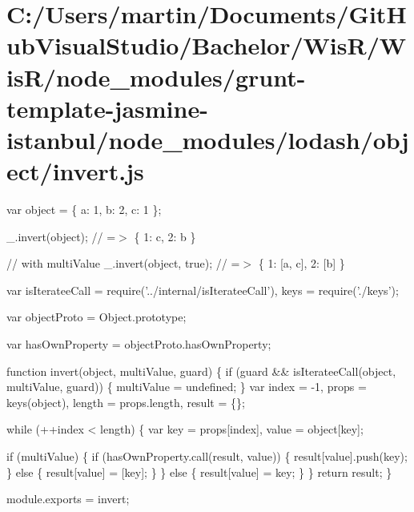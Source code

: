 \hypertarget{_c_1_2_users_2martin_2_documents_2_git_hub_visual_studio_2_bachelor_2_wis_r_2_wis_r_2node_moduleb4793deb825e06c600c1d3dfd71b7dc9}{}\section{C\+:/\+Users/martin/\+Documents/\+Git\+Hub\+Visual\+Studio/\+Bachelor/\+Wis\+R/\+Wis\+R/node\+\_\+modules/grunt-\/template-\/jasmine-\/istanbul/node\+\_\+modules/lodash/object/invert.\+js}
var object = \{ \textquotesingle{}a\textquotesingle{}\+: 1, \textquotesingle{}b\textquotesingle{}\+: 2, \textquotesingle{}c\textquotesingle{}\+: 1 \};

\+\_\+.\+invert(object); // =$>$ \{ \textquotesingle{}1\textquotesingle{}\+: \textquotesingle{}c\textquotesingle{}, \textquotesingle{}2\textquotesingle{}\+: \textquotesingle{}b\textquotesingle{} \}

// with {\ttfamily multi\+Value} \+\_\+.\+invert(object, true); // =$>$ \{ \textquotesingle{}1\textquotesingle{}\+: \mbox{[}\textquotesingle{}a\textquotesingle{}, \textquotesingle{}c\textquotesingle{}\mbox{]}, \textquotesingle{}2\textquotesingle{}\+: \mbox{[}\textquotesingle{}b\textquotesingle{}\mbox{]} \}


\begin{DoxyCodeInclude}
var isIterateeCall = require(\textcolor{stringliteral}{'../internal/isIterateeCall'}),
    keys = require(\textcolor{stringliteral}{'./keys'});

var objectProto = Object.prototype;

var hasOwnProperty = objectProto.hasOwnProperty;

\textcolor{keyword}{function} invert(\textcolor{keywordtype}{object}, multiValue, guard) \{
  \textcolor{keywordflow}{if} (guard && isIterateeCall(\textcolor{keywordtype}{object}, multiValue, guard)) \{
    multiValue = undefined;
  \}
  var index = -1,
      props = keys(\textcolor{keywordtype}{object}),
      length = props.length,
      result = \{\};

  \textcolor{keywordflow}{while} (++index < length) \{
    var key = props[index],
        value = \textcolor{keywordtype}{object}[key];

    \textcolor{keywordflow}{if} (multiValue) \{
      \textcolor{keywordflow}{if} (hasOwnProperty.call(result, value)) \{
        result[value].push(key);
      \} \textcolor{keywordflow}{else} \{
        result[value] = [key];
      \}
    \}
    \textcolor{keywordflow}{else} \{
      result[value] = key;
    \}
  \}
  \textcolor{keywordflow}{return} result;
\}

module.exports = invert;
\end{DoxyCodeInclude}
 